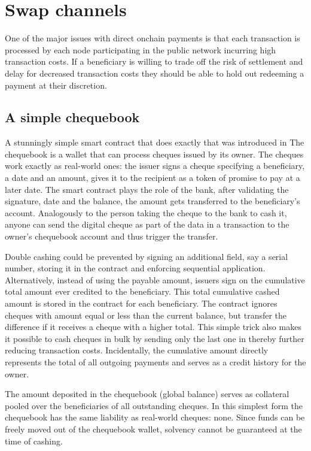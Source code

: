 \documentclass[a4paper,10pt]{article}
\begin{document}
\section{Swap channels}

One of the major issues with direct onchain payments is that each transaction is processed
by each node participating in the public network incurring high transaction costs.
If a beneficiary is willing to trade off the risk of settlement and delay for decreased transaction costs
 they should be able to hold out redeeming a payment at their discretion.

\subsection{A simple chequebook}

A stunningly simple smart contract that does exactly that was introduced in \cite{ethersphere2016sw3}
The \gls{chequebook} is a wallet that can process cheques issued by its owner. The cheques work
exactly as real-world ones: the issuer signs a cheque specifying a beneficiary, a date and an amount,
gives it to the recipient as a token of promise to pay at a later date. The smart contract plays the
role of the bank, after validating the signature, date and the balance, the amount gets transferred
to the beneficiary's account. Analogously to the person taking the cheque to the bank to cash it,
anyone can send the digital cheque as part of the data in a transaction to the owner's
chequebook account and thus trigger the transfer.

Double cashing could be prevented by signing an additional field, say a serial number,
storing it in the contract and enforcing sequential
application. Alternatively, instead of using the payable amount, issuers sign on the cumulative
total amount ever credited to the beneficiary. This total cumulative cashed amount is stored
in the contract for each beneficiary. The contract ignores cheques with amount equal or less
than the current balance, but transfer the difference if it receives a cheque with a higher
total.
This simple trick also makes it possible to cash cheques in bulk by sending only the last one in
thereby further reducing transaction costs. Incidentally, the cumulative amount
directly represents the total of all outgoing payments and serves as a credit history for the owner.

The amount deposited in the chequebook (\gls{global balance})
serves as collateral pooled over the beneficiaries of all outstanding cheques.
In this simplest form the chequebook has the same liability as real-world cheques: none.
Since funds can be freely moved out of the chequebook wallet, solvency cannot be guaranteed
at the time of cashing.
\end{document}
